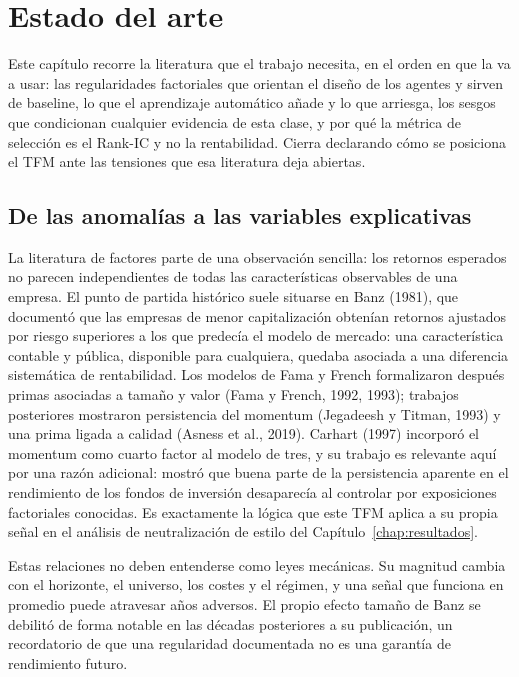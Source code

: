 \chapter{Estado del arte}
\label{chap:estado-arte}

Este capítulo recorre la literatura que el trabajo necesita, en el orden en que la va a usar: las
regularidades factoriales que orientan el diseño de los agentes y sirven de baseline, lo que el
aprendizaje automático añade y lo que arriesga, los sesgos que condicionan cualquier evidencia de
esta clase, y por qué la métrica de selección es el Rank-IC y no la rentabilidad. Cierra declarando
cómo se posiciona el TFM ante las tensiones que esa literatura deja abiertas.

\section{De las anomalías a las variables explicativas}

La literatura de factores parte de una observación sencilla: los retornos esperados no parecen
independientes de todas las características observables de una empresa. El punto de partida
histórico suele situarse en Banz (1981), que documentó que las empresas de menor capitalización
obtenían retornos ajustados por riesgo superiores a los que predecía el modelo de mercado: una
característica contable y pública, disponible para cualquiera, quedaba asociada a una diferencia
sistemática de rentabilidad. Los modelos de Fama y French formalizaron después primas asociadas a
tamaño y valor (Fama y French, 1992, 1993); trabajos
posteriores mostraron persistencia del momentum (Jegadeesh y Titman, 1993) y una prima ligada
a calidad (Asness et al., 2019). Carhart (1997) incorporó el momentum como cuarto factor
al modelo de tres, y su trabajo es relevante aquí por una razón adicional: mostró que buena parte
de la persistencia aparente en el rendimiento de los fondos de inversión desaparecía al controlar
por exposiciones factoriales conocidas. Es exactamente la lógica que este TFM aplica a su propia
señal en el análisis de neutralización de estilo del Capítulo~\ref{chap:resultados}.

Estas relaciones no deben entenderse como leyes mecánicas.
Su magnitud cambia con el horizonte, el universo, los costes y el régimen, y una señal que funciona
en promedio puede atravesar años adversos. El propio efecto tamaño de Banz se debilitó de forma
notable en las décadas posteriores a su publicación, un recordatorio de que una regularidad
documentada no es una garantía de rendimiento futuro.

